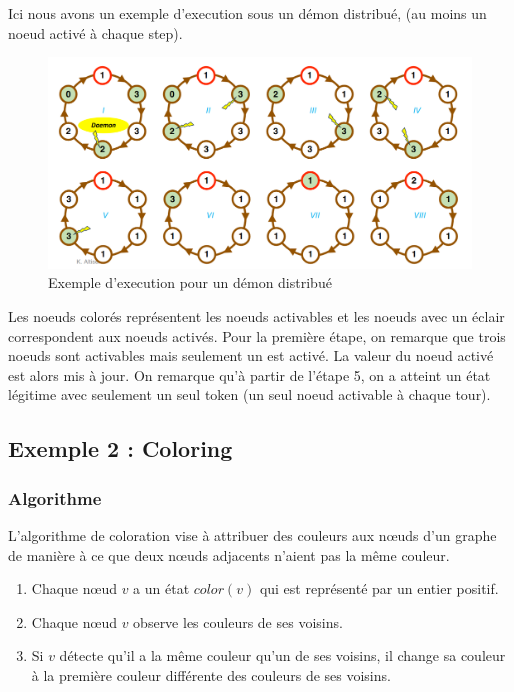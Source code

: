 \documentclass[11pt]{article}
\begin{document}
Ici nous avons un exemple d'execution sous un démon distribué, (au moins un noeud activé à chaque step). 

\begin{figure}[h]
    \centering
    \includegraphics[width=\textwidth]{figs/exec_distribue.png}
    \caption{Exemple d'execution pour un démon distribué}
    \label{fig:ex_disjkstra}
\end{figure}

Les noeuds colorés représentent les noeuds activables et les noeuds avec un éclair correspondent aux noeuds activés.
Pour la première étape, on remarque que trois noeuds sont activables mais seulement un est activé. 
La valeur du noeud activé est alors mis à jour. 
On remarque qu'à partir de l'étape 5, on a atteint un état légitime avec seulement un seul token (un seul noeud activable à chaque tour).

\subsection{Exemple 2 : Coloring}
\label{sec:orgec1e448}

\subsubsection{Algorithme}
\label{sec:orgb184cc9}
L'algorithme de coloration vise à attribuer des couleurs aux nœuds d'un graphe de manière à ce que deux nœuds adjacents n'aient pas la même couleur. 

\begin{enumerate}
\item Chaque nœud \(v\) a un état  \(color(v)\) qui est représenté par un entier positif.
\item Chaque nœud \(v\) observe les couleurs de ses voisins.
\item Si \(v\) détecte qu'il a la même couleur qu'un de ses voisins, il change sa couleur à la première couleur différente des couleurs de ses voisins.
\end{enumerate}
\end{document}
